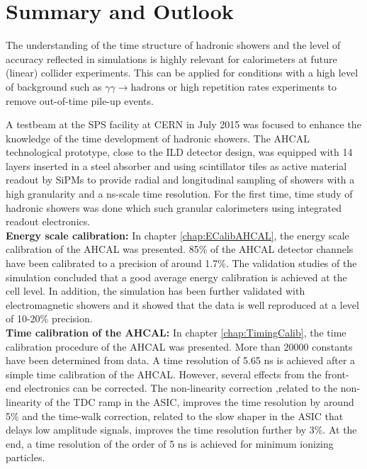 \section{Summary and Outlook}

The understanding of the time structure of hadronic showers and the level of accuracy reflected in \geant simulations is highly relevant for calorimeters at future (linear) collider experiments. This can be applied for conditions with a high level of background such as $\gamma\gamma \rightarrow \text{hadrons}$ or high repetition rates experiments to remove out-of-time pile-up events.

A testbeam at the SPS facility at CERN in July 2015 was focused to enhance the knowledge of the time development of hadronic showers. The AHCAL technological prototype, close to the ILD detector design, was equipped with 14 layers inserted in a steel absorber and using scintillator tiles as active material readout by SiPMs to provide radial and longitudinal sampling of showers with a high granularity and a ns-scale time resolution. For the first time, time study of hadronic showers was done which such granular calorimeters using integrated readout electronics.\\[0.1cm]

\noindent\textbf{Energy scale calibration:} In chapter \ref{chap:ECalibAHCAL}, the energy scale calibration of the AHCAL was presented. 85\% of the AHCAL detector channels have been calibrated to a precision of around 1.7\%. The validation studies of the simulation concluded that a good average energy calibration is achieved at the cell level. In addition, the simulation has been further validated with electromagnetic showers and it showed that the data is well reproduced at a level of 10-20\% precision.\\[0.1cm]

\noindent\textbf{Time calibration of the AHCAL:} In chapter \ref{chap:TimingCalib}, the time calibration procedure of the AHCAL was presented. More than 20000 constants have been determined from data. A time resolution of 5.65 ns is achieved after a simple time calibration of the AHCAL. However, several effects from the front-end electronics can be corrected. The non-linearity correction ,related to the non-linearity of the TDC ramp in the ASIC, improves the time resolution by around 5\% and the time-walk correction, related to the slow shaper in the ASIC that delays low amplitude signals, improves the time resolution further by 3\%. At the end, a time resolution of the order of 5 ns is achieved for minimum ionizing particles.\\[0.1cm]

